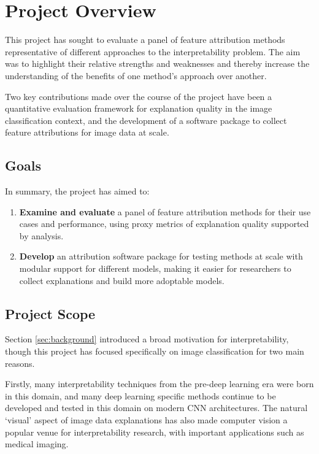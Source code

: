 \documentclass[main]{subfiles}
\begin{document}
\section{Project Overview}
This project has sought to evaluate a panel of feature attribution methods representative of different approaches to the interpretability problem. The aim was to highlight their relative strengths and weaknesses and thereby increase the understanding of the benefits of one method's approach over another.

Two key contributions made over the course of the project have been a quantitative evaluation framework for explanation quality in the image classification context, and the development of a software package to collect feature attributions for image data at scale.

\subsection*{Goals}
In summary, the project has aimed to:
\begin{enumerate}
	\item \textbf{Examine and evaluate} a panel of feature attribution methods for their use cases and performance, using proxy metrics of explanation quality supported by analysis.

	\item \textbf{Develop} an attribution software package for testing methods at scale with modular support for different models, making it easier for researchers to collect explanations and build more adoptable models.
	
\end{enumerate}

\subsection*{Project Scope}

Section \ref{sec:background} introduced a broad motivation for interpretability, though this project has focused specifically on image classification for two main reasons.

Firstly, many interpretability techniques from the pre-deep learning era were born in this domain, and many deep learning specific methods continue to be developed and tested in this domain on modern CNN architectures. The natural `visual' aspect of  image data explanations has also made computer vision a popular venue for interpretability research, with important applications such as medical imaging.
 
\end{document}

